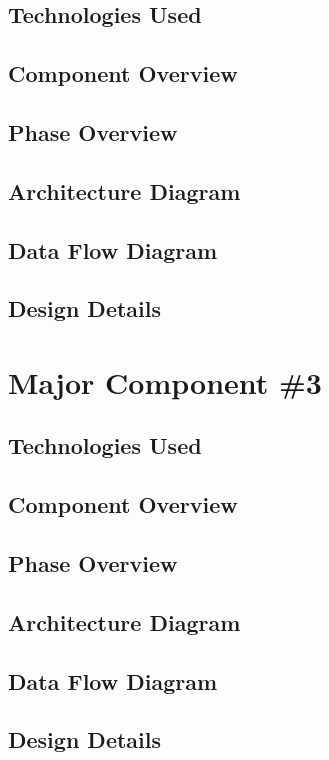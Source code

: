 \subsection{Technologies  Used}


\subsection{Component  Overview}


\subsection{Phase Overview}


\subsection{ Architecture  Diagram}



\subsection{Data Flow Diagram}



\subsection{Design Details}



\section{Major Component \#3 }

\subsection{Technologies  Used}


\subsection{Component  Overview}


\subsection{Phase Overview}


\subsection{ Architecture  Diagram}


\subsection{Data Flow Diagram}



\subsection{Design Details}



